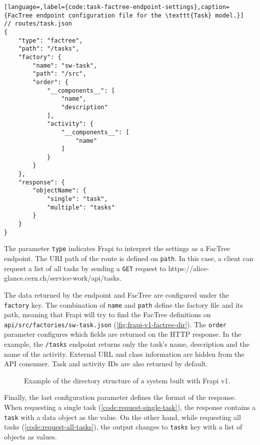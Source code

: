 \begin{lstlisting}[language=,label={code:task-factree-endpoint-settings},caption={FacTree endpoint configuration file for the \texttt{Task} model.}]
// routes/task.json
{
    "type": "factree",
    "path": "/tasks",
    "factory": {
        "name": "sw-task",
        "path": "/src",
        "order": {
            "__components__": [
                "name",
                "description"
            ],
            "activity": {
                "__components__": [
                    "name"
                ]
            }
        }
    },
    "response": {
        "objectName": {
            "single": "task",
            "multiple": "tasks"
        }
    }
}
\end{lstlisting}

The parameter \texttt{type} indicates Frapi to interpret the settings as a FacTree endpoint. The URI path of the route is defined on \texttt{path}. In this case, a client can request a list of all tasks by sending a \texttt{GET} request to https://alice-glance.cern.ch/service-work/api/tasks.

The data returned by the endpoint and FacTree are configured under the \texttt{factory} key.  The combination of \texttt{name} and \texttt{path} define the factory file and its path, meaning that Frapi will try to find the FacTree definitions on \texttt{api/src/factories/sw-task.json} (\autoref{fig:frapi-v1-factree-dir}). The \texttt{order} parameter configures which fields are returned on the HTTP response. In the example, the \texttt{/tasks} endpoint returns only the task's name, description and the name of the activity. External URL and class information are hidden from the API consumer. Task and activity IDs are also returned by default.

\begin{figure}
\centering
\begin{minipage}{0.9\textwidth}
\end{minipage}
\caption{Example of the directory structure of a system built with Frapi v1.}
\label{fig:frapi-v1-factree-dir}
\end{figure}

Finally, the last configuration parameter defines the format of the response. When requesting a single task (\autoref{code:request-single-task}), the response contains a \texttt{task} with a data object as the value. On the other hand, while requesting all tasks (\autoref{code:request-all-tasks}), the output changes to \texttt{tasks} key with a list of objects as values.

